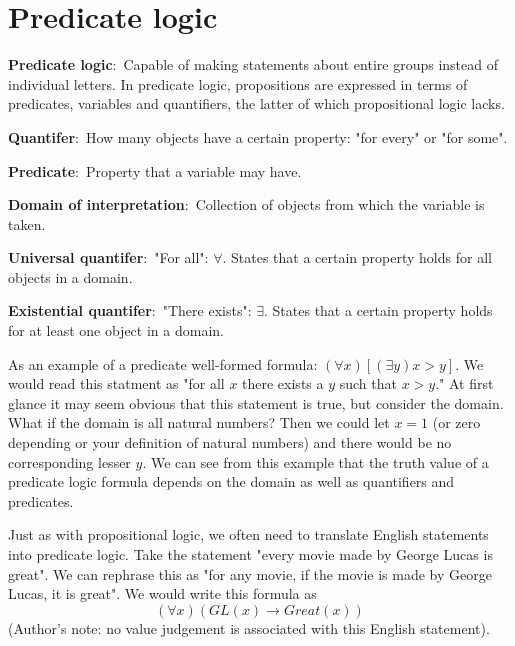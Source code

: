 \documentclass[nobib]{tufte-handout}
\newcommand{\defn}[2]{\noindent\textbf{#1}:\ #2}
\begin{document}
\section{Predicate logic}
\defn{Predicate logic}{Capable of making statements about entire 
groups instead of individual letters. In predicate logic, 
propositions are expressed in terms of predicates, 
variables and quantifiers}, the latter of which propositional logic lacks. 

\defn{Quantifer}{How many objects have a certain property: "for every" or "for some".}

\defn{Predicate}{Property that a variable may have.}

\defn{Domain of interpretation}{Collection of objects from which the variable is taken.}

\defn{Universal quantifer}{"For all": $\forall$}. States that a certain property holds
for all objects in a domain. 

\defn{Existential quantifer}{"There exists": $\exists$}. States that a certain property holds
for at least one object in a domain. 

As an example of a predicate well-formed formula: $(\forall x)[(\exists y) x > y]$. We would read this statment as 
"for all $x$ there exists a $y$ such that $x > y$." At first glance it may seem 
obvious that this statement is true, but consider the domain. What if the domain is 
all natural numbers? Then we could let $x=1$ (or zero depending
or your definition of natural numbers) and there would be no corresponding
lesser $y$. We can see from this example that the truth value of 
a predicate logic formula depends on the domain as well as quantifiers and predicates. 

Just as with propositional logic, we often need to translate English statements
into predicate logic. Take the statement "every movie made by George Lucas is great".
We can rephrase this as "for any movie, if the movie is made by George Lucas, it is great".
We would write this formula as
\[(\forall x)(GL(x) \rightarrow Great(x))\]
(Author's note: no value judgement is associated with this
English statement).
\end{document}
